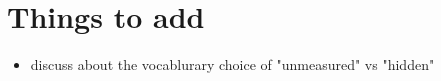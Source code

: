 \chapter{Things to add}
\begin{itemize}
    \item discuss about the vocablurary choice of "unmeasured" vs "hidden"
\end{itemize}
    